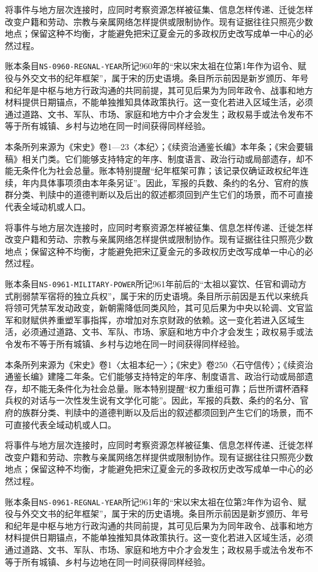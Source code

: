 将事件与地方层次连接时，应同时考察资源怎样被征集、信息怎样传递、迁徙怎样改变户籍和劳动、宗教与亲属网络怎样提供或限制协作。现有证据往往只照亮少数地点；保留这种不均衡，才能避免把宋辽夏金元的多政权历史改写成单一中心的必然过程。

账本条目\texttt{NS-0960-REGNAL-YEAR}所记960年的“宋以宋太祖在位第1年作为诏令、赋役与外交文书的纪年框架”，属于宋的历史语境。条目所示前因是新岁颁历、年号和纪年是中枢与地方行政沟通的共同前提，其可见后果为为同年政令、战事和地方材料提供日期锚点，不能单独推知具体政策执行。这一变化若进入区域生活，必须通过道路、文书、军队、市场、家庭和地方中介才会发生；政权易手或法令发布不等于所有城镇、乡村与边地在同一时间获得同样经验。

本条所列来源为《宋史》卷1—23〈本纪〉；《续资治通鉴长编》本年条；《宋会要辑稿》相关门类。它们能够支持特定的年序、制度语言、政治行动或局部遗存，却不能无条件化为社会总量。账本特别提醒“纪年框架可靠；该记录仅确证政权纪年连续，年内具体事项须由本年条另证”。因此，军报的兵数、条约的名分、官府的族群分类、判牍中的道德判断以及后出的叙述都须回到产生它们的场景，而不可直接代表全域动机或人口。

将事件与地方层次连接时，应同时考察资源怎样被征集、信息怎样传递、迁徙怎样改变户籍和劳动、宗教与亲属网络怎样提供或限制协作。现有证据往往只照亮少数地点；保留这种不均衡，才能避免把宋辽夏金元的多政权历史改写成单一中心的必然过程。

账本条目\texttt{NS-0961-MILITARY-POWER}所记961年前后的“太祖以宴饮、任官和调动方式削弱禁军宿将的独立兵权”，属于宋的历史语境。条目所示前因是五代以来统兵将领可凭禁军发动政变，新朝需降低同类风险，其可见后果为中央以轮调、文官监军和财赋供养重塑军事指挥，亦增加对东京财政的依赖。这一变化若进入区域生活，必须通过道路、文书、军队、市场、家庭和地方中介才会发生；政权易手或法令发布不等于所有城镇、乡村与边地在同一时间获得同样经验。

本条所列来源为《宋史》卷1〈太祖本纪一〉；《宋史》卷250〈石守信传〉；《续资治通鉴长编》建隆二年条。它们能够支持特定的年序、制度语言、政治行动或局部遗存，却不能无条件化为社会总量。账本特别提醒“权力重组可靠；后世所谓杯酒释兵权的对话与一次性发生说有文学化可能”。因此，军报的兵数、条约的名分、官府的族群分类、判牍中的道德判断以及后出的叙述都须回到产生它们的场景，而不可直接代表全域动机或人口。

将事件与地方层次连接时，应同时考察资源怎样被征集、信息怎样传递、迁徙怎样改变户籍和劳动、宗教与亲属网络怎样提供或限制协作。现有证据往往只照亮少数地点；保留这种不均衡，才能避免把宋辽夏金元的多政权历史改写成单一中心的必然过程。

账本条目\texttt{NS-0961-REGNAL-YEAR}所记961年的“宋以宋太祖在位第2年作为诏令、赋役与外交文书的纪年框架”，属于宋的历史语境。条目所示前因是新岁颁历、年号和纪年是中枢与地方行政沟通的共同前提，其可见后果为为同年政令、战事和地方材料提供日期锚点，不能单独推知具体政策执行。这一变化若进入区域生活，必须通过道路、文书、军队、市场、家庭和地方中介才会发生；政权易手或法令发布不等于所有城镇、乡村与边地在同一时间获得同样经验。

